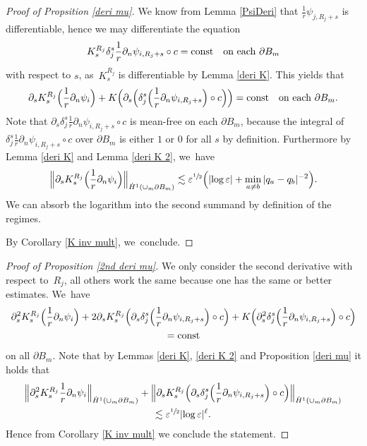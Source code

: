 \documentclass[10pt]{amsart}
\let\epsilon\varepsilon
\newcommand{\const}{\textup{const}}
\theoremstyle{definition}
\newcommand\Bnorm[1]{\Bigl\lVert #1\Bigr\rVert}
\newcommand\eq{=}
\let\de\partial
\let\eps\epsilon
\begin{document}
\begin{proof}[Proof of Propsition \ref{deri mu}]
We know from Lemma \ref{PsiDeri} that $\frac{1}{r}\psi_{j,R_j+s}$ is differentiable, hence we may differentiate the equation
\begin{align*}
K_s^{R_j}\delta_j^s\frac{1}{r}\de_n\psi_{i,R_j+s}\circ c\eq \const \quad\text{on each $\de B_m$}
\end{align*}
with respect to $s$, as~$K_s^{R_j}$ is differentiable by Lemma \ref{deri K}. This yields that
\begin{align*}
\de_sK_s^{R_j}\Bigl(\frac{1}{r}\de_n\psi_{i}\Bigr)+K\Bigl(\de_s\Bigl(\delta_j^s\Bigl(\frac{1}{r}\de_n\psi_{i,R_j+s}\Bigr)\circ c\Bigr)\Bigr)\eq \const \quad\text{on each $\de B_m$}.
\end{align*}
Note that $\de_s\delta_j^s\frac{1}{r}\de_n\psi_{i,R_j+s}\circ c$ is mean-free on each $\de B_m$, because the integral of \linebreak$\delta_j^s\frac{1}{r}\de_n\psi_{i,R_j+s}\circ c$ over $\de B_m$ is either $1$ or $0$ for all $s$ by definition. Furthermore by Lemma \ref{deri K} and Lemma \ref{deri K 2}, we~have
\begin{align*}
\Bnorm{\de_sK_s^{R_j}\Bigl(\frac{1}{r}\de_n\psi_{i}\Bigr)}_{\dot{H}^1(\cup_m \de B_m)}\lesssim \eps^{\sfrac{1}{2}}\Bigl(|{\log\eps}|+\min_{a\neq b}|q_a-q_b|^{-2}\Bigr).
\end{align*}
We can absorb the logarithm into the second summand by definition of the regimes.

By Corollary \ref{K inv mult}, we~conclude.
\end{proof}

\begin{proof}[Proof of Proposition \ref{2nd deri mu}]
We only consider the second derivative with respect to~$R_j$, all others work the same because one has the same or better estimates.
We~have
\begin{multline*}
\de_s^2K_s^{R_j}\Bigl(\frac{1}{r}\de_n\psi_i\Bigr)+2\de_sK_s^{R_j}\Bigl(\de_s\delta_j^s\Bigl(\frac{1}{r}\de_n\psi_{i,R_j+s}\Bigr)\circ c\Bigr)+K\Bigl(\de_s^2\delta_j^s\Bigl(\frac{1}{r}\de_n\psi_{i,R_j+s}\Bigr)\circ c\Bigr)\\
\eq \const
\end{multline*}
on all $\de B_m$.
Note that by Lemmas \ref{deri K}, \ref{deri K 2} and Proposition \ref{deri mu} it holds that
\begin{multline*}
\Bnorm{\de_s^2K_s^{R_j}\frac{1}{r}\de_n\psi_i}_{\dot{H}^1(\cup_m\de B_m)}+\Bnorm{\de_sK_s^{R_j}\Bigl(\de_s\delta_j^s\Bigl(\frac{1}{r}\de_n\psi_{i,R_j+s}\Bigr)\circ c\Bigr)}_{\dot{H}^1(\cup_m\de B_m)}\\
\lesssim\eps^{\sfrac{1}{2}}|{\log\eps}|^\ell.
\end{multline*}
Hence from Corollary \ref{K inv mult} we conclude the statement.\end{proof}
\end{document}
